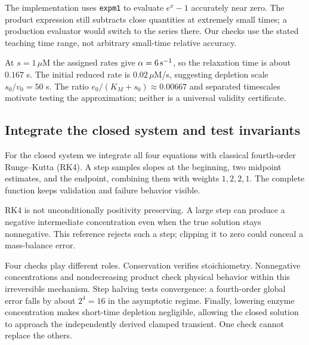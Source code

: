 
The implementation uses \texttt{expm1} to evaluate $e^x-1$ accurately near zero. The product expression still subtracts close quantities at extremely small times; a production evaluator would switch to the series there. Our checks use the stated teaching time range, not arbitrary small-time relative accuracy.

At $s=1\,\mu$M the assigned rates give $\alpha=6\,{\rm s}^{-1}$, so the relaxation time is about $0.167$ s. The initial reduced rate is $0.02\,\mu$M/s, suggesting depletion scale $s_0/v_0=50$ s. The ratio $e_0/(K_M+s_0)\approx0.00667$ and separated timescales motivate testing the approximation; neither is a universal validity certificate.

\subsection{Integrate the closed system and test invariants}

For the closed system we integrate all four equations with classical fourth-order Runge--Kutta (RK4). A step samples slopes at the beginning, two midpoint estimates, and the endpoint, combining them with weights $1,2,2,1$. The complete function keeps validation and failure behavior visible.


RK4 is not unconditionally positivity preserving. A large step can produce a negative intermediate concentration even when the true solution stays nonnegative. This reference rejects such a step; clipping it to zero could conceal a mass-balance error.


Four checks play different roles. Conservation verifies stoichiometry. Nonnegative concentrations and nondecreasing product check physical behavior within this irreversible mechanism. Step halving tests convergence: a fourth-order global error falls by about $2^4=16$ in the asymptotic regime. Finally, lowering enzyme concentration makes short-time depletion negligible, allowing the closed solution to approach the independently derived clamped transient. One check cannot replace the others.

